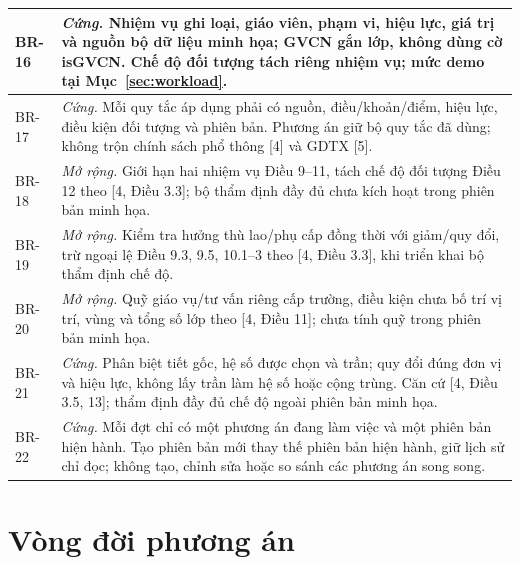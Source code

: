 \documentclass[12pt,a4paper]{report}
\begin{document}
\begin{longtable}{|p{1.45cm}|p{12.5cm}|}
BR-16 & \textit{Cứng.} Nhiệm vụ ghi loại, giáo viên, phạm vi, hiệu lực, giá trị và nguồn bộ dữ liệu minh họa; GVCN gắn lớp, không dùng cờ isGVCN. Chế độ đối tượng tách riêng nhiệm vụ; mức demo tại Mục~\ref{sec:workload}. \\\hline
BR-17 & \textit{Cứng.} Mỗi quy tắc áp dụng phải có nguồn, điều/khoản/điểm, hiệu lực, điều kiện đối tượng và phiên bản. Phương án giữ bộ quy tắc đã dùng; không trộn chính sách phổ thông [4] và GDTX [5]. \\\hline
BR-18 & \textit{Mở rộng.} Giới hạn hai nhiệm vụ Điều 9--11, tách chế độ đối tượng Điều 12 theo [4, Điều 3.3]; bộ thẩm định đầy đủ chưa kích hoạt trong phiên bản minh họa. \\\hline
BR-19 & \textit{Mở rộng.} Kiểm tra hưởng thù lao/phụ cấp đồng thời với giảm/quy đổi, trừ ngoại lệ Điều 9.3, 9.5, 10.1--3 theo [4, Điều 3.3], khi triển khai bộ thẩm định chế độ. \\\hline
BR-20 & \textit{Mở rộng.} Quỹ giáo vụ/tư vấn riêng cấp trường, điều kiện chưa bố trí vị trí, vùng và tổng số lớp theo [4, Điều 11]; chưa tính quỹ trong phiên bản minh họa. \\\hline
BR-21 & \textit{Cứng.} Phân biệt tiết gốc, hệ số được chọn và trần; quy đổi đúng đơn vị và hiệu lực, không lấy trần làm hệ số hoặc cộng trùng. Căn cứ [4, Điều 3.5, 13]; thẩm định đầy đủ chế độ ngoài phiên bản minh họa. \\\hline
BR-22 & \textit{Cứng.} Mỗi đợt chỉ có một phương án đang làm việc và một phiên bản hiện hành. Tạo phiên bản mới thay thế phiên bản hiện hành, giữ lịch sử chỉ đọc; không tạo, chỉnh sửa hoặc so sánh các phương án song song. \\\hline
\end{longtable}


\section{Vòng đời phương án}\label{sec:lifecycle}
\end{document}
